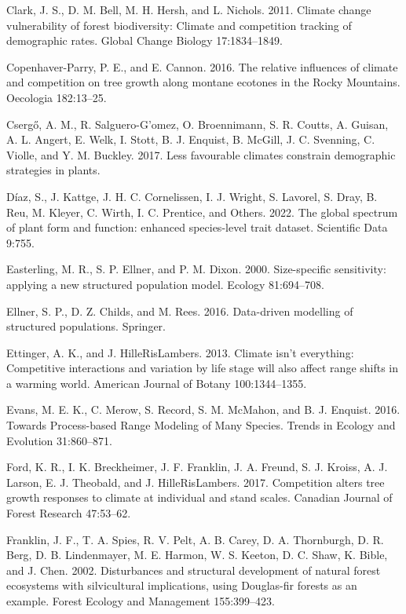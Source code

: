 \documentclass[12pt]{article}
\newlength{\cslhangindent}
\newenvironment{cslreferences}%
  {\setlength{\parindent}{0pt}%
  \everypar{\setlength{\hangindent}{\cslhangindent}}\ignorespaces}%
  {\par}
\begin{document}
\begin{cslreferences}
\leavevmode\hypertarget{ref-Clark2011}{}%
Clark, J. S., D. M. Bell, M. H. Hersh, and L. Nichols. 2011. Climate
change vulnerability of forest biodiversity: Climate and competition
tracking of demographic rates. Global Change Biology 17:1834--1849.

\leavevmode\hypertarget{ref-CopenhaverParry2016}{}%
Copenhaver-Parry, P. E., and E. Cannon. 2016. The relative influences of
climate and competition on tree growth along montane ecotones in the
Rocky Mountains. Oecologia 182:13--25.

\leavevmode\hypertarget{ref-Csergo2017}{}%
Csergő, A. M., R. Salguero-G\a'omez, O. Broennimann, S. R. Coutts, A.
Guisan, A. L. Angert, E. Welk, I. Stott, B. J. Enquist, B. McGill, J. C.
Svenning, C. Violle, and Y. M. Buckley. 2017. Less favourable climates
constrain demographic strategies in plants.

\leavevmode\hypertarget{ref-diaz2022}{}%
Díaz, S., J. Kattge, J. H. C. Cornelissen, I. J. Wright, S. Lavorel, S.
Dray, B. Reu, M. Kleyer, C. Wirth, I. C. Prentice, and Others. 2022. The
global spectrum of plant form and function: enhanced species-level trait
dataset. Scientific Data 9:755.

\leavevmode\hypertarget{ref-Easterling2000}{}%
Easterling, M. R., S. P. Ellner, and P. M. Dixon. 2000. Size-specific
sensitivity: applying a new structured population model. Ecology
81:694--708.

\leavevmode\hypertarget{ref-Ellner2016}{}%
Ellner, S. P., D. Z. Childs, and M. Rees. 2016. Data-driven modelling of
structured populations. Springer.

\leavevmode\hypertarget{ref-Ettinger2013}{}%
Ettinger, A. K., and J. HilleRisLambers. 2013. Climate isn't everything:
Competitive interactions and variation by life stage will also affect
range shifts in a warming world. American Journal of Botany
100:1344--1355.

\leavevmode\hypertarget{ref-Evans2016}{}%
Evans, M. E. K., C. Merow, S. Record, S. M. McMahon, and B. J. Enquist.
2016. Towards Process-based Range Modeling of Many Species. Trends in
Ecology and Evolution 31:860--871.

\leavevmode\hypertarget{ref-Ford2017}{}%
Ford, K. R., I. K. Breckheimer, J. F. Franklin, J. A. Freund, S. J.
Kroiss, A. J. Larson, E. J. Theobald, and J. HilleRisLambers. 2017.
Competition alters tree growth responses to climate at individual and
stand scales. Canadian Journal of Forest Research 47:53--62.

\leavevmode\hypertarget{ref-Franklin2002}{}%
Franklin, J. F., T. A. Spies, R. V. Pelt, A. B. Carey, D. A. Thornburgh,
D. R. Berg, D. B. Lindenmayer, M. E. Harmon, W. S. Keeton, D. C. Shaw,
K. Bible, and J. Chen. 2002. Disturbances and structural development of
natural forest ecosystems with silvicultural implications, using
Douglas-fir forests as an example. Forest Ecology and Management
155:399--423.


\end{cslreferences}
\end{document}
